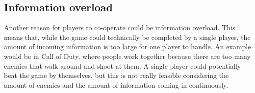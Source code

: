 		\subsection{Information overload} \label{ssec:overload}
			Another reason for players to co-operate could be information
			overload. This means that, while the game could technically be
			completed by a single player, the amount of incoming information is
			too large for one player to handle. An example would be in Call of
			Duty, where people work together because there are too many enemies
			that walk around and shoot at them. A single player could
			potentially beat the game by themselves, but this is not really
			feasible considering the amount of enemies and the amount of
			information coming in continuously.

	
